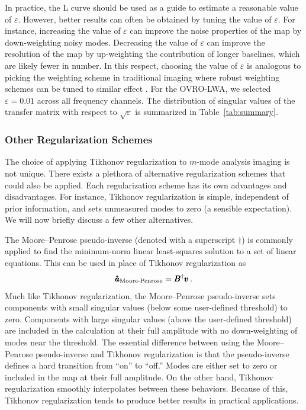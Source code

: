 \begin{bibunit}
In practice, the L curve should be used as a guide to estimate a reasonable value of $\varepsilon$.
However, better results can often be obtained by tuning the value of $\varepsilon$. For instance,
increasing the value of $\varepsilon$ can improve the noise properties of the map by down-weighting
noisy modes. Decreasing the value of $\varepsilon$ can improve the resolution of the map by
up-weighting the contribution of longer baselines, which are likely fewer in number. In this
respect, choosing the value of $\varepsilon$ is analogous to picking the weighting scheme in
traditional imaging where robust weighting schemes can be tuned to similar effect \citep{briggs}.
For the OVRO-LWA, we selected $\varepsilon = 0.01$ across all frequency channels. The distribution
of singular values of the transfer matrix with respect to $\sqrt{\varepsilon}$ is summarized in
Table~\ref{tab:summary}.

\subsubsection{Other Regularization Schemes}

The choice of applying Tikhonov regularization to $m$-mode analysis imaging is not unique. There
exists a plethora of alternative regularization schemes that could also be applied. Each
regularization scheme has its own advantages and disadvantages. For instance, Tikhonov
regularization is simple, independent of prior information, and sets unmeasured modes to zero (a
sensible expectation). We will now briefly discuss a few other alternatives.

The Moore--Penrose pseudo-inverse (denoted with a superscript $\dagger$) is commonly applied to find
the minimum-norm linear least-squares solution to a set of linear equations. This can be used in
place of Tikhonov regularization as
\begin{equation}
    \pmb{\hat a}_\text{Moore-Penrose} = \pmb B^\dagger\pmb v\,.
\end{equation}
Much like Tikhonov regularization, the Moore--Penrose pseudo-inverse sets components with small
singular values (below some user-defined threshold) to zero. Components with large singular values
(above the user-defined threshold) are included in the calculation at their full amplitude with no
down-weighting of modes near the threshold. The essential difference between using the
Moore--Penrose pseudo-inverse and Tikhonov regularization is that the pseudo-inverse defines a hard
transition from ``on'' to ``off.'' Modes are either set to zero or included in the map at their full
amplitude. On the other hand, Tikhonov regularization smoothly interpolates between these behaviors.
Because of this, Tikhonov regularization tends to produce better results in practical applications.


\end{bibunit}
